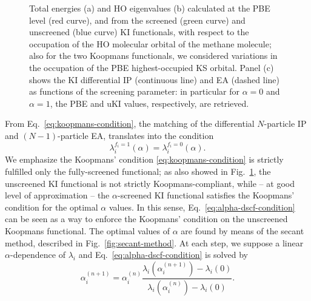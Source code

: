 \begin{figure}
    \centering
    \usebox{\measurebox}
    \begin{minipage}{.48\linewidth}
        \vfill
    \end{minipage}
    \caption[Total energy and $\varepsilon_{\rm HO}$ vs. $f_{\rm HO}$ for $CH_4$ molecule]{Total energies (a) and HO eigenvalues (b) calculated at the PBE level (red curve), and from the screened (green curve) and unscreened (blue curve) KI functionals, with respect to the occupation of the HO molecular orbital of the methane molecule; also for the two Koopmans functionals, we considered variations in the occupation of the PBE highest-occupied KS orbital. Panel (c) shows the KI differential IP (continuous line) and EA (dashed line) as functions of the screening parameter: in particular for $\alpha=0$ and $\alpha=1$, the PBE and uKI values, respectively, are retrieved.}
    \label{fig:pwl-ki-dft}
\end{figure}

From Eq.~\eqref{eq:koopmans-condition}, the matching of the differential $N$-particle IP and $(N-1)$-particle EA, translates into the condition
%
\begin{equation}
    \lambda_i^{f_i=1}(\alpha) = \lambda_i^{f_i=0}(\alpha) .
    \label{eq:alpha-dscf-condition}
\end{equation}
%
We emphasize the Koopmans' condition \eqref{eq:koopmans-condition} is strictly fulfilled only the fully-screened functional; as also showed in Fig.~\ref{fig:pwl-ki-dft}, the unscreened KI functional is not strictly Koopmans-compliant, while -- at good level of approximation -- the $\alpha$-screened KI functional satisfies the Koopmans' condition for the optimal $\alpha$ values. In this sense, Eq.~\eqref{eq:alpha-dscf-condition} can be seen as a way to enforce the Koopmans' condition on the unscreened Koopmans functional. The optimal values of $\alpha$ are found by means of the secant method, described in Fig.~\ref{fig:secant-method}. At each step, we suppose a linear $\alpha$-dependence of $\lambda_i$ and Eq.~\eqref{eq:alpha-dscf-condition} is solved by
%
\begin{equation}
    \alpha_i^{(n+1)} = \alpha_i^{(n)} \frac{\lambda_i(\alpha_i^{(n+1)}) - \lambda_i(0)}{\lambda_i(\alpha_i^{(n)}) - \lambda_i(0)} .
    \label{eq:alpha-intermediate-expression}
\end{equation}

